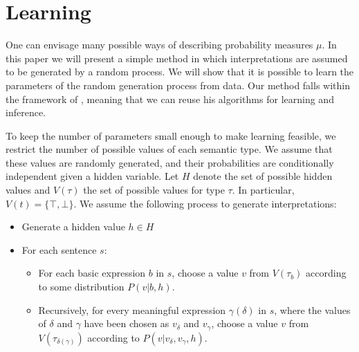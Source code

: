 \documentclass[letterpaper]{article}
\newcommand{\citet}[1]{\citeauthor{#1} \shortcite{#1}}
\begin{document}

\section{Learning}

One can envisage many possible ways of describing probability measures
$\mu$. In this paper we will present a simple method in which
interpretations are assumed to be generated by a random process. We
will show that it is possible to learn the parameters of the random
generation process from data. Our method falls within the framework of
\citet{Sato:95}, meaning that we can reuse his algorithms
for learning and inference.

To keep the number of parameters small enough to make learning
feasible, we restrict the number of possible values of each semantic
type. We assume that these values are randomly generated, and their
probabilities are conditionally independent given a hidden
variable. Let $H$ denote the set of possible hidden values and $V(\tau)$  the
set of possible values for type $\tau$. In particular, $V(t) = \{\top, \bot\}$. We assume the following process to generate
interpretations:
\begin{itemize}
\item Generate a hidden value $h\in H$
\item For each sentence $s$:
\begin{itemize}
\item For each basic expression $b$ in $s$, choose a value $v$ from
  $V(\tau_b)$ according to some distribution $P(v|b,h)$.
\item Recursively, for every meaningful expression $\gamma(\delta)$ in
  $s$, where the values of $\delta$ and $\gamma$ have been chosen as
  $v_\delta$ and $v_\gamma$, choose a value $v$ from
  $V(\tau_{\delta(\gamma)})$ according to $P(v|v_\delta, v_\gamma,
  h)$.
\end{itemize}
\end{itemize}
\end{document}
